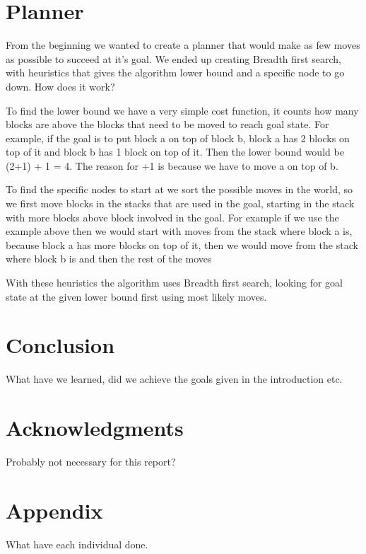 \documentclass[11pt]{article}
\begin{document}
\section{Planner}
From the beginning we wanted to create a planner that would make as few moves as possible to succeed at it's goal. We ended up creating Breadth first search, with heuristics that gives the algorithm lower bound and a specific node to go down. How does it work?

To find the lower bound we have a very simple cost function, it counts how many blocks are above the blocks that need to be moved to reach goal state. For example, if the goal is to put block a on top of block b, block a has 2 blocks on top of it and block b has 1 block on top of it. Then the lower bound would be (2+1) + 1 = 4. The reason for +1 is because we have to move a on top of b. 

To find the specific nodes to start at we sort the possible moves in the world, so we first move blocks in the stacks that are used in the goal, starting in the stack with more blocks above block involved in the goal. For example if we use the example above then we would  start with moves from the stack where block a is, because block a has more blocks on top of it, then we would move from the stack where block b is and then the rest of the moves

With these heuristics the algorithm uses Breadth first search, looking for goal state at the given lower bound first using most likely moves.

\section{Conclusion}
What have we learned, did we achieve the goals given in the introduction etc.

\section{Acknowledgments}
Probably not necessary for this report?




\section*{Appendix}
What have each individual done.
\end{document}
